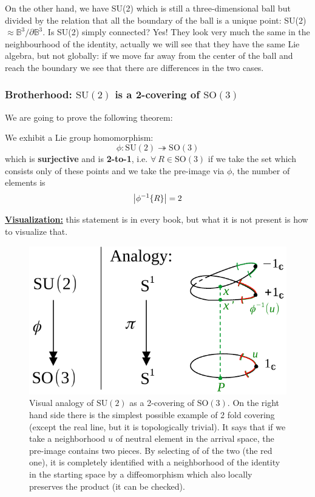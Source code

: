 \documentclass[../main.tex]{subfiles}
\begin{document}
On the other hand, we have SU(2) which is still a three-dimensional ball but divided by the relation that all the boundary of the ball is a unique point: SU(2)$\approx\mathbb{B}^3\slash\partial\mathbb{B}^3$. Is SU(2) simply connected? Yes! They look very much the same in the neighbourhood of the identity, actually we will see that they have the same Lie algebra, but not globally: if we move far away from the center of the ball and reach the boundary we see that there are differences in the two cases. 
\subsubsection{Brotherhood: $\textrm{SU}(2)$ is a 2-covering of $\textrm{SO}(3)$}
We are going to prove the following theorem:
\begin{theorem}
We exhibit a Lie group homomorphism:
\[
    \phi : \textrm{SU}(2) \twoheadrightarrow \textrm{SO}(3)
\]
which is \textbf{surjective} and is \textbf{2-to-1}, i.e. $\forall \ R \in \textrm{SO}(3)$ if we take the set which consists only of these points and we take the pre-image via $\phi$, the number of elements is
\[
\abs{\phi^{-1}\Bqty{R}}=2
\]
\end{theorem}
\underline{\textbf{Visualization:}} this statement is in every book, but what it is not present is how to visualize that.
\begin{figure}[h!]
    \includegraphics[width=1\linewidth]{images/analogy_SU2_SO3.pdf}
	\caption[Visual analogy of $\textrm{SU}(2)$ as a 2-covering of $\textrm{SO}(3)$]{Visual analogy of $\textrm{SU}(2)$ as a 2-covering of $\textrm{SO}(3)$. On the right hand side there is the simplest possible example of 2 fold covering (except the real line, but it is topologically trivial). It says that if we take a neighborhood $u$ of neutral element in the arrival space, the pre-image contains two pieces. By selecting of of the two (the red one), it is completely identified with a neighborhood of the identity in the starting space by a diffeomorphism which also locally preserves the product (it can be checked).}
\end{figure}
\end{document}
